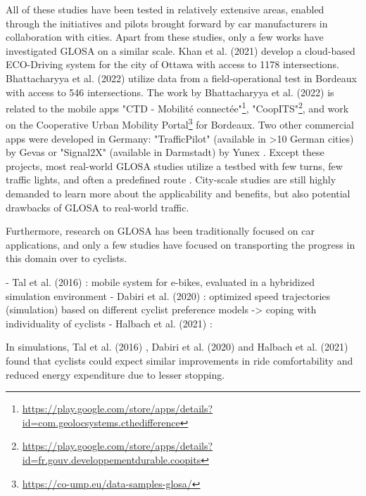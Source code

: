 All of these studies have been tested in relatively extensive areas, enabled through the initiatives and pilots brought forward by car manufacturers in collaboration with cities. Apart from these studies, only a few works have investigated GLOSA on a similar scale. Khan et al. (2021) \cite{khan_eco-drive_2021} develop a cloud-based ECO-Driving system for the city of Ottawa with access to 1178 intersections. Bhattacharyya et al. (2022) \cite{bhattacharyya_assessing_2022} utilize data from a field-operational test in Bordeaux with access to 546 intersections. The work by Bhattacharyya et al. (2022) \cite{bhattacharyya_assessing_2022} is related to the mobile apps "CTD - Mobilité connectée"\footnote{\url{https://play.google.com/store/apps/details?id=com.geolocsystems.cthedifference}}, "CoopITS"\footnote{\url{https://play.google.com/store/apps/details?id=fr.gouv.developpementdurable.coopits}}, and work on the Cooperative Urban Mobility Portal\footnote{\url{https://co-ump.eu/data-samples-glosa/}} for Bordeaux. Two other commercial apps were developed in Germany: "TrafficPilot" (available in >10 German cities) by Gevas or "Signal2X" (available in Darmstadt) by Yunex \cite{yunex_traffic_v2x-kommunikation_2023}. Except these projects, most real-world GLOSA studies utilize a testbed with few turns, few traffic lights, and often a predefined route \cite{iglesias_i2v_2008, schweiger_elisatm_2011, raubitschek_predictive_2011, koukoumidis_signalguru_2011, koukoumidis_leveraging_2012, hao_eco-approach_2019, fickas_fast_2019, chen_developing_2022}. City-scale studies are still highly demanded to learn more about the applicability and benefits, but also potential drawbacks of GLOSA to real-world traffic.

Furthermore, research on GLOSA has been traditionally focused on car applications, and only a few studies have focused on transporting the progress in this domain over to cyclists. 

- Tal et al. (2016) \cite{tal_vehicular-communications-based_2016}: mobile system for e-bikes, evaluated in a hybridized simulation environment
- Dabiri et al. (2020) \cite{dabiri_optimized_2020}: optimized speed trajectories (simulation) based on different cyclist preference models -> coping with individuality of cyclists
- Halbach et al. (2021) \cite{halbach_cooperative_2021}: 


In simulations, Tal et al. (2016) \cite{tal_vehicular-communications-based_2016}, Dabiri et al. (2020) \cite{dabiri_optimized_2020} and Halbach et al. (2021) \cite{halbach_cooperative_2021} found that cyclists could expect similar improvements in ride comfortability and reduced energy expenditure due to lesser stopping.

